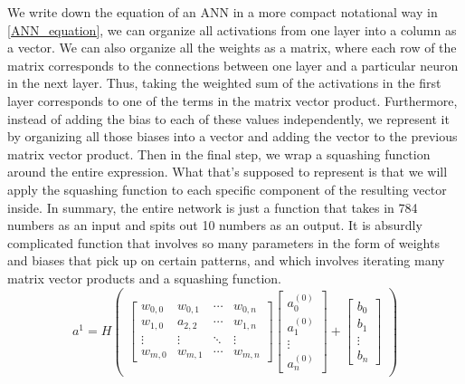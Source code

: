 \documentclass[master]{thesis-uestc}
\begin{document}
We write down the equation of an ANN in a more compact notational way in \ref{ANN_equation}, we can organize all activations from one layer into a column as a vector. We can also organize all the weights as a matrix, where each row of the matrix corresponds to the connections between one layer and a particular neuron in the next layer. Thus, taking the weighted sum of the activations in the first layer corresponds to one of the terms in the matrix vector product. Furthermore, instead of adding the bias to each of these values independently, we represent it by organizing all those biases into a vector and adding the vector to the previous matrix vector product. Then in the final step, we wrap a squashing function around the entire expression. What that's supposed to represent is that we will apply the squashing function to each specific component of the resulting vector inside. In summary, the entire network is just a function that takes in 784 numbers as an input and spits out 10 numbers as an output. It is absurdly complicated function that involves so many parameters in the form of weights and biases that pick up on certain patterns, and which involves iterating many matrix vector products and a squashing function.
\begin{equation}
    a^1 = 
H\begin{pmatrix}\begin{bmatrix}
  w_{0,0} & w_{0,1} & \cdots & w_{0,n} \\
  w_{1,0} & a_{2,2} & \cdots & w_{1,n} \\
  \vdots  & \vdots  & \ddots & \vdots  \\
  w_{m,0} & w_{m,1} & \cdots & w_{m,n} 
 \end{bmatrix}
 \begin{bmatrix}
  a_0^{(0)} \\
  a_1^{(0)} \\
  \vdots \\
  a_n^{(0)} 
 \end{bmatrix} + 
 \begin{bmatrix}
  b_0 \\
  b_1 \\
  \vdots \\
  b_n 
 \end{bmatrix}\end{pmatrix}
 \label{ANN_equation}
\end{equation}
\end{document}
